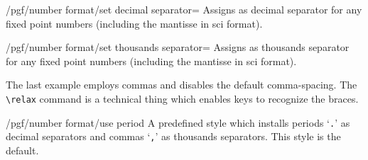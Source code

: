 {\begin{key}{/pgf/number format/set decimal separator=}
Assigns  as decimal separator for any fixed point numbers (including the mantisse in sci format).
\end{key}

\begin{key}{/pgf/number format/set thousands separator=}
Assigns  as thousands separator for any fixed point numbers (including the mantisse in sci format).

\begin{codeexample}[]
\end{codeexample}
\begin{codeexample}[]
\end{codeexample}

\begin{codeexample}[]
\end{codeexample}
\begin{codeexample}[]
\end{codeexample}
\begin{codeexample}[]
\end{codeexample}
The last example employs commas and disables the default comma-spacing. The \texttt{\textbackslash relax} command is a technical thing which enables \pgfname keys to recognize the braces.
\end{key}

\begin{key}{/pgf/number format/use period}
A predefined style which installs periods `\texttt{.}' as decimal separators and commas `\texttt{,}' as thousands separators. This style is the default.

\begin{codeexample}[]
\end{codeexample}
\begin{codeexample}[]
\end{codeexample}
\end{key}

}
